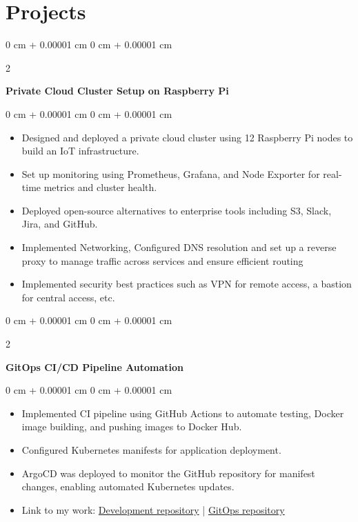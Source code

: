 \documentclass[10pt, letterpaper]{article}
\newenvironment{highlights}{
    \begin{itemize}[
        topsep=0.10 cm,
        parsep=0.10 cm,
        partopsep=0pt,
        itemsep=0pt,
        leftmargin=0 cm + 10pt
    ]
}{
    \end{itemize}
} %
\newenvironment{onecolentry}{
    \begin{adjustwidth}{
        0 cm + 0.00001 cm
    }{
        0 cm + 0.00001 cm
    }
}{
    \end{adjustwidth}
} %
\newenvironment{twocolentry}[2][]{
    \onecolentry
    \def\secondColumn{#2}
    \setcolumnwidth{\fill, 4.5 cm}
    \begin{paracol}{2}
}{
    \switchcolumn \raggedleft \secondColumn
    \end{paracol}
    \endonecolentry
} %
\begin{document}
    \section{Projects}

        \begin{twocolentry}{
        }
            \textbf{Private Cloud Cluster Setup on Raspberry Pi}\end{twocolentry}

        \vspace{0.10 cm}
        \begin{onecolentry}
            \begin{highlights}
                \item Designed and deployed a private cloud cluster using 12 Raspberry Pi nodes to build an IoT infrastructure.
                \item Set up monitoring using Prometheus, Grafana, and Node Exporter for real-time metrics and cluster health.
                \item Deployed open-source alternatives to enterprise tools including S3, Slack, Jira, and GitHub.
                \item Implemented Networking, Configured DNS resolution and set up a reverse proxy to manage traffic across services and ensure efficient routing
                \item Implemented security best practices such as VPN for remote access, a bastion for central access, etc.
            \end{highlights}
        \end{onecolentry}


        \vspace{0.2 cm}

        \begin{twocolentry}{
        }
            \textbf{GitOps CI/CD Pipeline Automation}\end{twocolentry}

        \vspace{0.10 cm}
        \begin{onecolentry}
            \begin{highlights}
                \item Implemented CI pipeline using GitHub Actions to automate testing, Docker image building, and pushing images to Docker Hub.
                \item Configured Kubernetes manifests for application deployment.
                \item ArgoCD was deployed to monitor the GitHub repository for manifest changes, enabling automated Kubernetes updates.
                \item Link to my work: \href{https://github.com/Charan-Sharan/CRUD}{Development repository} | \href{https://github.com/Charan-Sharan/gitops}{GitOps repository}
            \end{highlights}
        \end{onecolentry}
\end{document}
